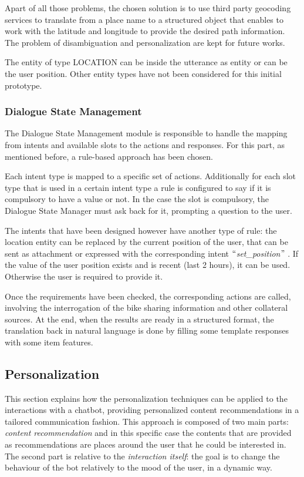 Apart of all those problems, the chosen solution is to use third party geocoding services to translate from a place name to a structured object that enables to work with the latitude and longitude to provide the desired path information. The problem of disambiguation and personalization are kept for future works.

The entity of type LOCATION can be inside the utterance as entity or can be the user position. Other entity types have not been considered for this initial prototype.

\subsubsection{Dialogue State Management}
The Dialogue State Management module is responsible to handle the mapping from intents and available slots to the actions and responses. For this part, as mentioned before, a rule-based approach has been chosen.

Each intent type is mapped to a specific set of actions. Additionally for each slot type that is used in a certain intent type a rule is configured to say if it is compulsory to have a value or not. In the case the slot is compulsory, the Dialogue State Manager must ask back for it, prompting a question to the user.

The intents that have been designed however have another type of rule: the location entity can be replaced by the current position of the user, that can be sent as attachment or expressed with the corresponding intent $``$\textit{set\_position}$"$ . If the value of the user position exists and is recent (last 2 hours), it can be used. Otherwise the user is required to provide it.

Once the requirements have been checked, the corresponding actions are called, involving the interrogation of the bike sharing information and other collateral sources. At the end, when the results are ready in a structured format, the translation back in natural language is done by filling some template responses with some item features.

\subsection{Personalization}
\label{approachPersonalization}

This section explains how the personalization techniques can be applied to the interactions with a chatbot, providing personalized content recommendations in a tailored communication fashion. This approach is composed of two main parts: \textit{content recommendation} and in this specific case the contents that are provided as recommendations are places around the user that he could be interested in. The second part is relative to the \textit{interaction itself}: the goal is to change the behaviour of the bot relatively to the mood of the user, in a dynamic way.

